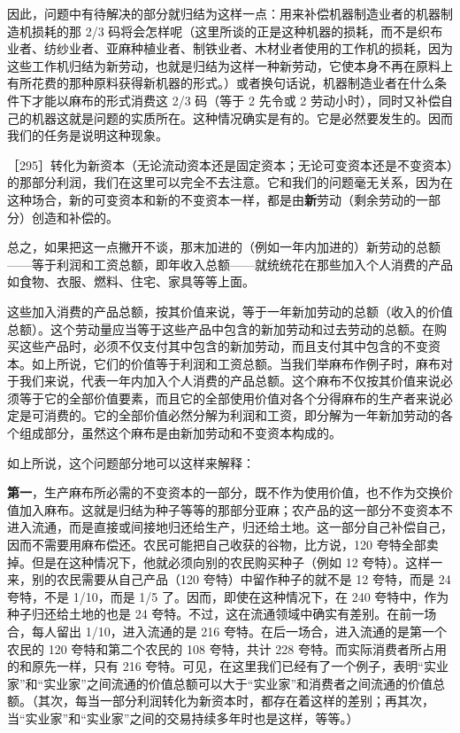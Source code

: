 因此，问题中有待解决的部分就归结为这样一点：用来补偿机器制造业者的机器制造机损耗的那 2/3 码将会怎样呢（这里所谈的正是这种机器的损耗，而不是织布业者、纺纱业者、亚麻种植业者、制铁业者、木材业者使用的工作机的损耗，因为这些工作机归结为新劳动，也就是归结为这样一种新劳动，它使本身不再在原料上有所花费的那种原料获得新机器的形式。）或者换句话说，机器制造业者在什么条件下才能以麻布的形式消费这 2/3 码（等于 2 先令或 2 劳动小时），同时又补偿自己的机器这就是问题的实质所在。这种情况确实是有的。它是必然要发生的。因而我们的任务是说明这种现象。

［295］转化为新资本（无论流动资本还是固定资本；无论可变资本还是不变资本）的那部分利润，我们在这里可以完全不去注意。它和我们的问题毫无关系，因为在这种场合，新的可变资本和新的不变资本一样，都是由\textbf{新}劳动（剩余劳动的一部分）创造和补偿的。

总之，如果把这一点撇开不谈，那末加进的（例如一年内加进的）新劳动的总额——等于利润和工资总额，即年收入总额——就统统花在那些加入个人消费的产品如食物、衣服、燃料、住宅、家具等等上面。

这些加入消费的产品总额，按其价值来说，等于一年新加劳动的总额（收入的价值总额）。这个劳动量应当等于这些产品中包含的新加劳动和过去劳动的总额。在购买这些产品时，必须不仅支付其中包含的新加劳动，而且支付其中包含的不变资本。如上所说，它们的价值等于利润和工资总额。当我们举麻布作例子时，麻布对于我们来说，代表一年内加入个人消费的产品总额。这个麻布不仅按其价值来说必须等于它的全部价值要素，而且它的全部使用价值对各个分得麻布的生产者来说必定是可消费的。它的全部价值必然分解为利润和工资，即分解为一年新加劳动的各个组成部分，虽然这个麻布是由新加劳动和不变资本构成的。

如上所说，这个问题部分地可以这样来解释：

\textbf{第一}，生产麻布所必需的不变资本的一部分，既不作为使用价值，也不作为交换价值加入麻布。这就是归结为种子等等的那部分亚麻；农产品的这一部分不变资本不进入流通，而是直接或间接地归还给生产，归还给土地。这一部分自己补偿自己，因而不需要用麻布偿还。\fontbox{~\{}农民可能把自己收获的谷物，比方说，120 夸特全部卖掉。但是在这种情况下，他就必须向别的农民购买种子（例如 12 夸特）。这样一来，别的农民需要从自己产品（120 夸特）中留作种子的就不是 12 夸特，而是 24 夸特，不是 1/10，而是 1/5 了。因而，即使在这种情况下，在 240 夸特中，作为种子归还给土地的也是 24 夸特。不过，这在流通领域中确实有差别。在前一场合，每人留出 1/10，进入流通的是 216 夸特。在后一场合，进入流通的是第一个农民的 120 夸特和第二个农民的 108 夸特，共计 228 夸特。而实际消费者所占用的和原先一样，只有 216 夸特。可见，在这里我们已经有了一个例子，表明“实业家”和“实业家”之间流通的价值总额可以大于“实业家”和消费者之间流通的价值总额。\fontbox{\}~}（其次，每当一部分利润转化为新资本时，都存在着这样的差别；再其次，当“实业家”和“实业家”之间的交易持续多年时也是这样，等等。）

